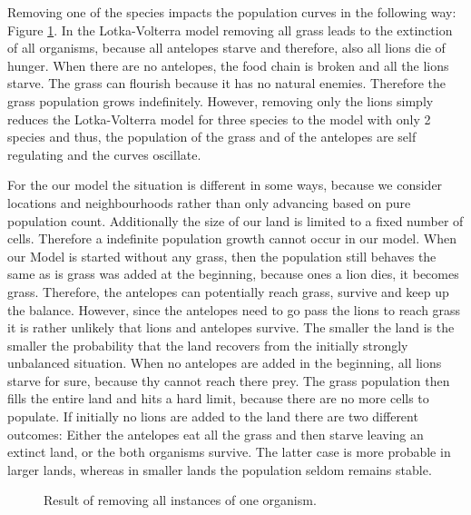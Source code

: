\documentclass[11pt]{article}
\begin{document}
Removing one of the species impacts the population curves in the following way: Figure \ref{fig:removingOneOrganism}. In the Lotka-Volterra model removing all grass leads to the extinction of all organisms, because all antelopes starve and therefore, also all lions die of hunger.
When there are no antelopes, the food chain is broken and all the lions starve. The grass can flourish because it has no natural enemies. Therefore the grass population grows indefinitely. However, removing only the lions simply reduces the Lotka-Volterra model for three species to the model with only 2 species and thus, the population of the grass and of the antelopes are self regulating and the curves oscillate.

For the our model the situation is different in some ways, because we consider locations and neighbourhoods rather than only advancing based on pure population count. Additionally the size of our land is limited to a fixed number of cells. Therefore a indefinite population growth cannot occur in our model. When our Model is started without any grass, then the population still behaves the same as is grass was added at the beginning, because ones a lion dies, it becomes grass. Therefore, the antelopes can potentially reach grass, survive and keep up the balance. However, since the antelopes need to go pass the lions to reach grass it is rather unlikely that lions and antelopes survive. The smaller the land is the smaller the probability that the land recovers from the initially strongly unbalanced situation.
When no antelopes are added in the beginning, all lions starve for sure, because thy cannot reach there prey. The grass population then fills the entire land and hits a hard limit, because there are no more cells to populate. 
If initially no lions are added to the land there are two different outcomes: Either the antelopes eat all the grass and then starve leaving an extinct land, or the both organisms survive. The latter case is more probable in larger lands, whereas in smaller lands the population seldom remains stable.

\ifx
\begin{figure}
\centering
{}
\caption{Result of removing all instances of one organism.}
\label{fig:removingOneOrganism}
\end{figure}
\fi
\end{document}

